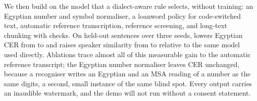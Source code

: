We then build \BA on the model that a dialect-aware rule selects, without training: an Egyptian number and
symbol normaliser, a loanword policy for code-switched text, automatic reference transcription, reference
screening, and long-text chunking with checks. On held-out sentences over three seeds, \BA lowers Egyptian CER from
 to  and raises speaker similarity from
 to  relative to the same model used directly. Ablations
trace almost all of this measurable gain to the automatic reference transcript; the Egyptian number normaliser leaves
CER unchanged, because a recogniser writes an Egyptian and an MSA reading of a number as the same digits, a second,
small instance of the same blind spot. Every output carries an inaudible watermark, and the demo will not run without
a consent statement.

